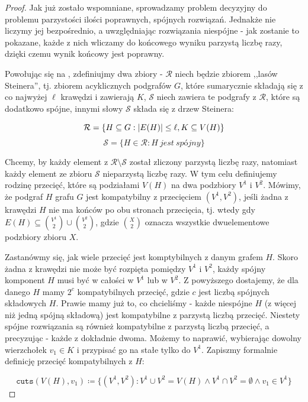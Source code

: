 \documentclass[12pt, oneside]{report}
\begin{document}
\begin{proof}
Jak już zostało wspomniane, sprowadzamy problem decyzyjny do problemu parzystości ilości poprawnych, spójnych rozwiązań. Jednakże nie liczymy jej bezpośrednio, a uwzględniając rozwiązania niespójne - jak zostanie to pokazane, każde z nich wliczamy do końcowego wyniku parzystą liczbę razy, dzięki czemu wynik końcowy jest poprawny.

Powołując się na \cite{parametrized_algorithms}, zdefiniujmy dwa zbiory - $\mathcal{R}$ niech będzie zbiorem ,,lasów Steinera'', tj. zbiorem acyklicznych podgrafów $G$, które sumarycznie składają się z co najwyżej $\ell$ krawędzi i zawierają $K$, $\mathcal{S}$ niech zawiera te podgrafy z $\mathcal{R}$, które są dodatkowo spójne, innymi słowy $\mathcal{S}$ składa się z drzew Steinera:

$$\mathcal{R} = \{H \subseteq G: \abs{E(H)} \leq \ell, K \subseteq V(H)\}$$
$$\mathcal{S} = \{H \in \mathcal{R}: H\ jest\ sp\mbox{ó}jny\}$$

Chcemy, by każdy element z $\mathcal{R} \setminus \mathcal{S}$ został zliczony parzystą liczbę razy, natomiast każdy element ze zbioru $\mathcal{S}$ nieparzystą liczbę razy. W tym celu definiujemy rodzinę przecięć, które są podziałami $V(H)$ na dwa podzbiory $V^1$ i $V^2$. Mówimy, że podgraf $H$ grafu $G$ jest kompatybilny z przecięciem $(V^1, V^2)$, jeśli żadna z krawędzi $H$ nie ma końców po obu stronach przecięcia, tj. wtedy gdy $E(H) \subseteq {V^1 \choose 2} \cup {V^2 \choose 2}$, gdzie ${X \choose 2}$ oznacza wszystkie dwuelementowe podzbiory zbioru $X$.  

Zastanówmy się, jak wiele przecięć jest komptybilnych z danym grafem $H$. Skoro żadna z krawędzi nie może być rozpięta pomiędzy $V^1$ i $V^2$, każdy spójny komponent $H$ musi być w całości w $V^1$ lub w $V^2$. Z powyższego dostajemy, że dla danego $H$ mamy $2^c$ kompatybilnych przecięć, gdzie $c$ jest liczbą spójnych składowych $H$. Prawie mamy już to, co chcieliśmy - każde niespójne $H$ (z więcej niż jedną spójną składową) jest kompatybilne z parzystą liczbą przecięć. Niestety spójne rozwiązania są również kompatybilne z parzystą liczbą przecięć, a precyzując - każde z dokładnie dwoma. Możemy to naprawić, wybierając dowolny wierzchołek $v_1 \in K$ i przypisać go na stałe tylko do $V^1$. Zapiszmy formalnie definicję przecięć kompatybilnych z $H$:

$$\texttt{cuts} (V(H), v_1) \coloneqq \{(V^1, V^2): V^1 \cup V^2 = V(H) \wedge V^1 \cap V^2 = \emptyset \wedge v_1 \in V^1\}$$


\end{proof}
\end{document}
